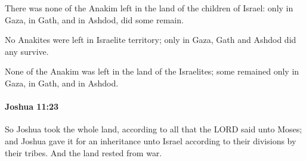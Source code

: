 			\begin{versebox}
					\item[BHS] 
					\item[ASV] There was none of the Anakim left in the land of the children of Israel: only in Gaza, in Gath, and in Ashdod, did some remain.
					\item[NIV] No Anakites were left in Israelite territory; only in Gaza, Gath and Ashdod did any survive.
					\item[NRSV] None of the Anakim was left in the land of the Israelites; some remained only in Gaza, in Gath, and in Ashdod.
			\end{versebox}

		\paragraph{Joshua 11:23} %
			\label{JOSHUA-11-23}

			So Joshua took the whole land, according to all that the LORD said unto Moses; and Joshua gave it for an inheritance unto Israel according to their divisions by their tribes. And the land rested from war.

